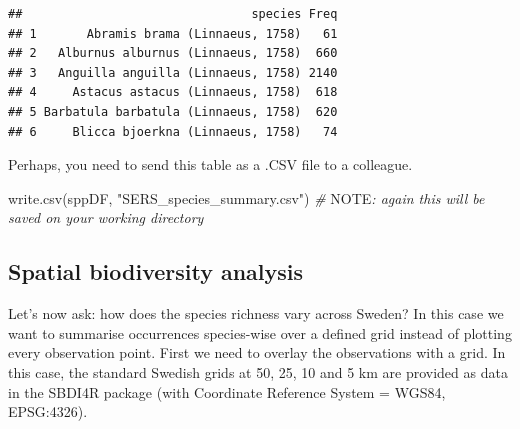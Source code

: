 \documentclass[
  10pt,
]{article}
\newenvironment{Shaded}{\begin{snugshade}}{\end{snugshade}}
\newcommand{\AlertTok}[1]{\textcolor[rgb]{0.94,0.16,0.16}{#1}}
\newcommand{\CommentTok}[1]{\textcolor[rgb]{0.56,0.35,0.01}{\textit{#1}}}
\newcommand{\FunctionTok}[1]{\textcolor[rgb]{0.00,0.00,0.00}{#1}}
\newcommand{\NormalTok}[1]{#1}
\newcommand{\StringTok}[1]{\textcolor[rgb]{0.31,0.60,0.02}{#1}}
\begin{document}
\begin{verbatim}
##                                species Freq
## 1       Abramis brama (Linnaeus, 1758)   61
## 2   Alburnus alburnus (Linnaeus, 1758)  660
## 3   Anguilla anguilla (Linnaeus, 1758) 2140
## 4     Astacus astacus (Linnaeus, 1758)  618
## 5 Barbatula barbatula (Linnaeus, 1758)  620
## 6     Blicca bjoerkna (Linnaeus, 1758)   74
\end{verbatim}

Perhaps, you need to send this table as a .CSV file to a colleague.

\begin{Shaded}
\begin{Highlighting}[]
\FunctionTok{write.csv}\NormalTok{(sppDF, }\StringTok{"SERS\_species\_summary.csv"}\NormalTok{)}
\CommentTok{\# }\AlertTok{NOTE}\CommentTok{: again this will be saved on your working directory}
\end{Highlighting}
\end{Shaded}

\hypertarget{spatial-biodiversity-analysis}{%
\subsection{Spatial biodiversity analysis}\label{spatial-biodiversity-analysis}}

Let's now ask: how does the species richness vary across Sweden? In this case we
want to summarise occurrences species-wise over a defined grid instead of plotting
every observation point. First we need to overlay the observations with a grid.
In this case, the standard Swedish grids at 50, 25, 10 and 5 km are provided as
data in the SBDI4R package (with Coordinate Reference System = WGS84, EPSG:4326).
\end{document}
